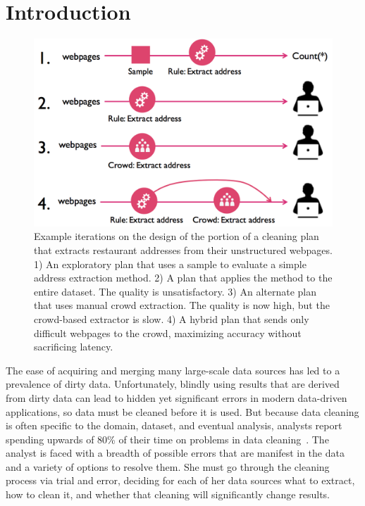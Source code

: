 \section{Introduction}\label{sec:intro}

\begin{figure}[t]
\centering
\vspace{-0.5cm}
\includegraphics[width = .4\textwidth]{figs/lifecycle.png}
\vspace{-0.4cm}
\caption{Example iterations on the design of the portion of a cleaning plan that extracts restaurant addresses from their unstructured webpages.  
1) An exploratory plan that uses a sample to evaluate a simple address extraction method.
2) A plan that applies the method to the entire dataset. The quality is unsatisfactory. 
3) An alternate plan that uses manual crowd extraction. The quality is now high, but the crowd-based extractor is slow. 
4) A hybrid plan that sends only difficult webpages to the crowd, maximizing accuracy without sacrificing latency.}
\label{fig:ex-plan}
\vspace{-0.3cm}
\end{figure}

%
%
The ease of acquiring and merging many large-scale data sources has led to a prevalence of dirty data.
Unfortunately, blindly using results that are derived from dirty data can lead to hidden yet significant errors in modern data-driven applications, so data must be cleaned before it is used.
But because data cleaning is often specific to the domain, dataset, and eventual analysis, analysts report spending upwards of 80\% of their time on problems in data cleaning~\cite{kandel2012}.
The analyst is faced with a breadth of possible errors that are manifest in the data and a variety of options to resolve them.
She must go through the cleaning process via trial and error, deciding for each of her data sources what to extract, how to clean it, and whether that cleaning will significantly change results.

